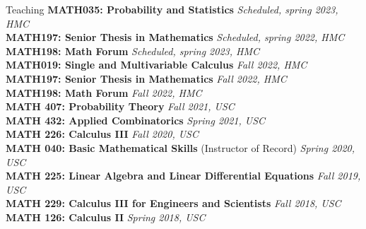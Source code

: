 \documentclass{cv} %
\begin{document}
\begin{rSection}{Teaching}
  \textbf{MATH035: Probability and Statistics} \hfill \textit{Scheduled, spring 2023, HMC}\\
  \textbf{MATH197: Senior Thesis in Mathematics} \hfill \textit{Scheduled, spring 2022, HMC}\\
  \textbf{MATH198: Math Forum} \hfill \textit{Scheduled, spring 2023, HMC}\\
  \textbf{MATH019: Single and Multivariable Calculus} \hfill \textit{Fall 2022, HMC}\\
  \textbf{MATH197: Senior Thesis in Mathematics} \hfill \textit{Fall 2022, HMC}\\
  \textbf{MATH198: Math Forum} \hfill \textit{Fall 2022, HMC}\\
  \textbf{MATH 407: Probability Theory} \hfill \textit{Fall 2021, USC} \\
  \textbf{MATH 432: Applied Combinatorics} \hfill \textit{Spring 2021, USC} \\
  \textbf{MATH 226: Calculus III} \hfill \textit{Fall 2020, USC} \\
  \textbf{MATH 040: Basic Mathematical Skills} (Instructor of Record) \hfill \textit{Spring 2020, USC} \\
  \textbf{MATH 225: Linear Algebra and Linear Differential Equations} \hfill \textit{Fall 2019, USC} \\
  \textbf{MATH 229: Calculus III for Engineers and Scientists} \hfill \textit{Fall 2018, USC} \\
  \textbf{MATH 126: Calculus II} \hfill \textit{Spring 2018, USC}
\end{rSection}
\end{document}
